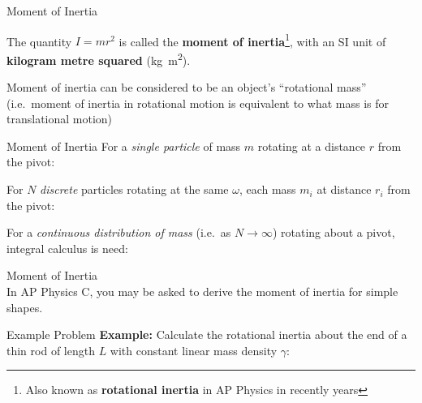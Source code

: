 \documentclass[12pt,compress,aspectratio=169]{beamer}
\begin{document}
\begin{frame}{Moment of Inertia}
    
    
  The quantity $I=mr^2$ is called the \textbf{moment of inertia}\footnote{Also
  known as \textbf{rotational inertia} in AP Physics in recently years}, with
  an SI unit of \textbf{kilogram metre squared} (\si{\kilo\gram\metre\squared}).


  \vspace{-.15in}Moment of inertia can be considered to be an object's
  ``rotational mass'' (i.e.\ moment of inertia in rotational motion is
  equivalent to what mass is for translational motion)
  \vspace{.3in}
\end{frame}



\begin{frame}{Moment of Inertia}
  For a \emph{single particle} of mass $m$ rotating at a distance $r$ from the
  pivot:
  

  \vspace{-.1in}For $N$ \emph{discrete} particles rotating at the same
  $\omega$, each mass $m_i$ at distance $r_i$ from the pivot:


  For a \emph{continuous distribution of mass} (i.e.\ as $N\to\infty$) rotating
  about a pivot, integral calculus is need:

\end{frame}



\begin{frame}{Moment of Inertia}
  \centering
  \\
  In AP Physics C, you may be asked to derive the moment of inertia for simple
  shapes.
\end{frame}


\begin{frame}[t]{Example Problem}
  \textbf{Example:} Calculate the rotational inertia about the end of a thin
  rod of length $L$ with constant linear mass density $\gamma$:
  \begin{center}
  \end{center}
\end{frame}
\end{document}
